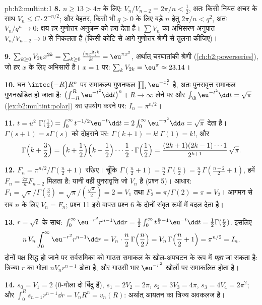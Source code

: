 \begin{solution}{pb:b2:multint:1}
\textbf{8.} $n \geq 13 > 4\pi$ के लिए: $V_n/V_{n-2} = 2\pi/n <
\tfrac12$, अतः किसी नियत अचर के साथ $V_{n} \leq C\cdot 2^{-n/2}$; और
बेहतर, किसी भी $q > 0$ के लिए बड़े $n$ हेतु $2\pi/n < q^2$, अतः $V_n/q^n \to 0$: क्षय हर
गुणोत्तर अनुक्रम को हरा देता है। $\sum V_n$ का अभिसरण अनुपात $V_n/V_{n-2} \to 0$ से
निकलता है (किसी कोटि से आगे गुणोत्तर श्रेणी से तुलना कीजिए)।

\textbf{9.} $\sum_{k\geq0}V_{2k}x^{2k} =
\sum_{k\geq0}\frac{(\pi x^2)^k}{k!} = \eu^{\pi x^2}$, अर्थात् चरघातांकी श्रेणी (\cref{ch:b2:powerseries}), जो हर $x$ के लिए
अभिसारी है। $x = 1$ पर: $\sum_kV_{2k} = \eu^\pi \approx
23.14$।

\textbf{10.} घन $\intcc{-R}R^n$ पर समाकल्य गुणनफल $\prod_i\eu^{-x_i^2}$ है, अतः पुनरावृत्त समाकल
गुणनखंडित हो जाता है: $\bigl(\int_{-R}^R\eu^{-t^2}\dd t\bigr)^n$। $R \to \infty$ लेने पर और
$\int_\R\eu^{-t^2}\dd t = \sqrt\pi$
(\cref{ex:b2:multint:polar}) का उपयोग करने पर: $I_n = \pi^{n/2}$।

\textbf{11.} $t = u^2$ $\Gamma(\tfrac12) =
\int_0^\infty t^{-1/2}\eu^{-t}\dd t =
2\int_0^\infty\eu^{-u^2}\dd u = \sqrt\pi$ देता है। $\Gamma(s+1) = s\Gamma(s)$ को दोहराने पर: $\Gamma(k+1) = k!\,\Gamma(1) =
k!$, और
\[
\Gamma\Bigl(k + \frac32\Bigr)
= \Bigl(k + \frac12\Bigr)\Bigl(k - \frac12\Bigr)\cdots
\frac12\cdot\Gamma\Bigl(\frac12\Bigr)
= \frac{(2k+1)(2k-1)\cdots1}{2^{k+1}}\,\sqrt\pi .
\]

\textbf{12.} $F_n = \pi^{n/2}/\Gamma(\frac n2 + 1)$ रखिए। चूँकि $\Gamma(\frac n2 + 1) = \frac n2\,\Gamma(\frac n2) =
\frac n2\,\Gamma(\frac{n-2}2 + 1)$, हमें $F_n =
\frac{2\pi}nF_{n-2}$ मिलता है: यानी वही
पुनरावृत्ति जो $V_n$ है (प्रश्न 5)। आधार: $F_1 = \sqrt\pi/\Gamma(\frac32) =
\sqrt\pi/(\frac{\sqrt\pi}2) = 2 = V_1$ तथा $F_2 =
\pi/\Gamma(2) = \pi = V_2$। आगमन से सब
$n$ के लिए $V_n = F_n$; प्रश्न 11 इसे वापस प्रश्न 6 के दोनों संवृत रूपों
में बदल देता है।

\textbf{13.} $r = \sqrt t$ के साथ: $\int_0^\infty
\eu^{-r^2}r^{n-1}\dd r = \frac12\int_0^\infty
t^{\frac n2 - 1}\eu^{-t}\dd t = \frac12\Gamma(\frac n2)$. इसलिए
\[
n\,V_n\int_0^\infty\eu^{-r^2}r^{n-1}\dd r
= V_n\cdot\frac n2\,\Gamma\Bigl(\frac n2\Bigr)
= V_n\,\Gamma\Bigl(\frac n2 + 1\Bigr) = \pi^{n/2} = I_n .
\]
दोनों पक्ष सिद्ध हो जाने पर सर्वसमिका को गाउस समाकल के खोल-अपघटन
के रूप में \emph{पढ़ा} जा सकता है: त्रिज्या $r$ का गोला 
$nV_nr^{n-1}$ ढोता है, और गाउसी भार $\eu^{-r^2}$ खोलों पर समाकलित होता है।

\textbf{14.} $s_0 = V_1 = 2$ ($0$-गोला दो बिंदु हैं), $s_1 = 2V_2 = 2\pi$, $s_2 = 3V_3 = 4\pi$, $s_3 = 4V_4 =
2\pi^2$; और $\int_0^R s_{n-1}r^{n-1}\dd r = V_nR^n =
v_n(R)$:
अर्थात्  आयतन का त्रिज्य अवकलज है।


\end{solution}
